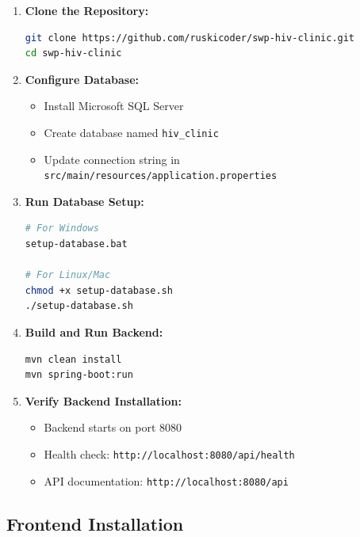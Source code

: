 \documentclass[12pt,a4paper]{article}
\begin{document}
\begin{enumerate}
    \item \textbf{Clone the Repository:}
    \begin{lstlisting}[language=bash]
git clone https://github.com/ruskicoder/swp-hiv-clinic.git
cd swp-hiv-clinic
    \end{lstlisting}
    
    \item \textbf{Configure Database:}
    \begin{itemize}
        \item Install Microsoft SQL Server
        \item Create database named \texttt{hiv\_clinic}
        \item Update connection string in \texttt{src/main/resources/application.properties}
    \end{itemize}
    
    \item \textbf{Run Database Setup:}
    \begin{lstlisting}[language=bash]
# For Windows
setup-database.bat

# For Linux/Mac
chmod +x setup-database.sh
./setup-database.sh
    \end{lstlisting}
    
    \item \textbf{Build and Run Backend:}
    \begin{lstlisting}[language=bash]
mvn clean install
mvn spring-boot:run
    \end{lstlisting}
    
    \item \textbf{Verify Backend Installation:}
    \begin{itemize}
        \item Backend starts on port 8080
        \item Health check: \texttt{http://localhost:8080/api/health}
        \item API documentation: \texttt{http://localhost:8080/api}
    \end{itemize}
\end{enumerate}

\subsection{Frontend Installation}
\end{document}

